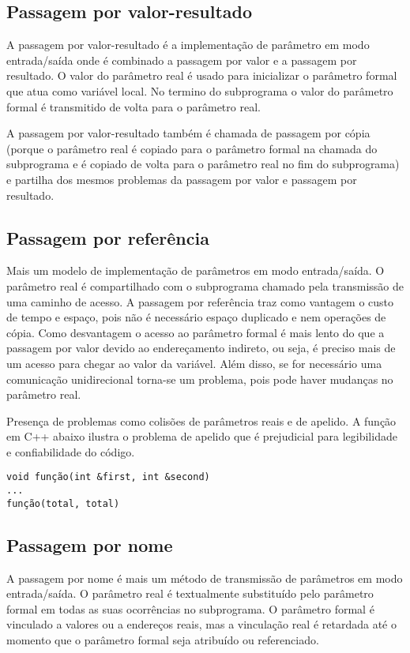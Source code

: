 \subsection{Passagem por valor-resultado}
A passagem por valor-resultado é a implementação de parâmetro em modo entrada/saída onde é combinado a passagem por valor e a passagem por resultado. O valor do parâmetro real é usado para inicializar o parâmetro formal que atua como variável local. No termino do subprograma o valor do parâmetro formal é transmitido de volta para o parâmetro real. 

A passagem por valor-resultado também é chamada de passagem por cópia (porque o parâmetro real é copiado para o parâmetro formal na chamada do subprograma e é copiado de volta para o parâmetro real no fim do subprograma) e partilha dos mesmos problemas da passagem por valor e passagem por resultado.

\subsection{Passagem por referência}
Mais um modelo de implementação de parâmetros em modo entrada/saída. O parâmetro real é compartilhado com o subprograma chamado pela transmissão de uma caminho de acesso.
A passagem por referência traz como vantagem o custo de tempo e espaço, pois não é necessário espaço duplicado e nem operações de cópia. Como desvantagem o acesso ao parâmetro formal é mais lento do que a passagem por valor devido ao endereçamento indireto, ou seja, é preciso mais de um acesso para chegar ao valor da variável. Além disso, se for necessário uma comunicação unidirecional torna-se um problema, pois pode haver mudanças no parâmetro real.

Presença de problemas como colisões de parâmetros reais e de apelido. A função em C++ abaixo ilustra o problema de apelido que é prejudicial para legibilidade e confiabilidade do código.

\begin{verbatim}
void função(int &first, int &second)
...
função(total, total)
\end{verbatim}

\subsection{Passagem por nome}
A passagem por nome é mais um método de transmissão de parâmetros em modo entrada/saída. O parâmetro real é textualmente substituído pelo parâmetro formal em todas as suas ocorrências no subprograma. O parâmetro formal é vinculado a valores ou a endereços reais, mas a vinculação real é retardada até o momento que o parâmetro formal seja atribuído ou referenciado.


